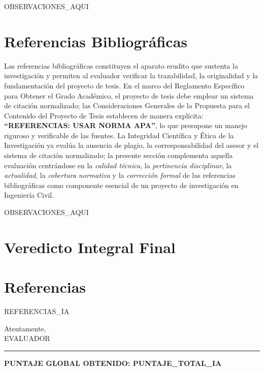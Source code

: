 \documentclass[12pt,a4paper]{report}
\begin{document}
{{OBSERVACIONES_AQUI}}


\section{Referencias Bibliográficas}

Las referencias bibliográficas constituyen el aparato erudito que sustenta la investigación y permiten al evaluador verificar la trazabilidad, la originalidad y la fundamentación del proyecto de tesis. En el marco del Reglamento Específico para Obtener el Grado Académico, el proyecto de tesis debe emplear un sistema de citación normalizado; las Consideraciones Generales de la Propuesta para el Contenido del Proyecto de Tesis establecen de manera explícita: \textbf{``REFERENCIAS: USAR NORMA APA''}, lo que presupone un manejo riguroso y verificable de las fuentes. La Integridad Científica y Ética de la Investigación ya evalúa la ausencia de plagio, la corresponsabilidad del asesor y el sistema de citación normalizado; la presente sección complementa aquella evaluación centrándose en la \textit{calidad técnica}, la \textit{pertinencia disciplinar}, la \textit{actualidad}, la \textit{cobertura normativa} y la \textit{corrección formal} de las referencias bibliográficas como componente esencial de un proyecto de investigación en Ingeniería Civil.



{{OBSERVACIONES_AQUI}}


\section*{Veredicto Integral Final}
\vspace{0.5cm}

\newpage\section*{Referencias}
\begin{list}{}{\setlength{\itemindent}{-1.27cm}\setlength{\leftmargin}{1.27cm}}
{{REFERENCIAS_IA}}
\end{list}

Atentamente,\\[1cm]
{{EVALUADOR}}

\vfill\hrule\vspace{0.2cm}\begin{center}
\textbf{PUNTAJE GLOBAL OBTENIDO: {{PUNTAJE_TOTAL_IA}}}
\end{center}
\end{document}
